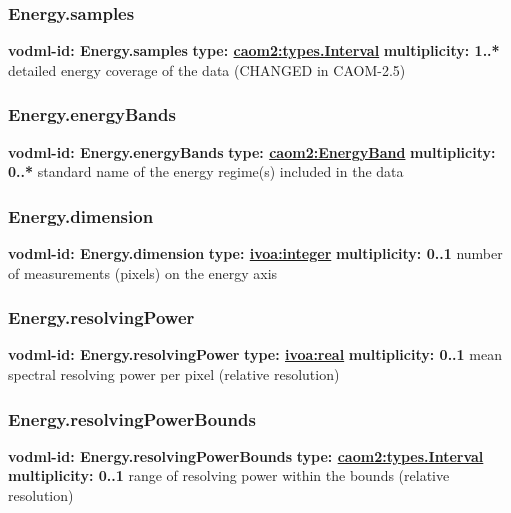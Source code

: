     \subsubsection{Energy.samples}
      \textbf{vodml-id: Energy.samples} \newline
      \textbf{type: \hyperref[sect:types.Interval]{caom2:types.Interval}} \newline
      \textbf{multiplicity: 1..*} \newline
      detailed energy coverage of the data (CHANGED in CAOM-2.5)

    \subsubsection{Energy.energyBands}
      \textbf{vodml-id: Energy.energyBands} \newline
      \textbf{type: \hyperref[sect:EnergyBand]{caom2:EnergyBand}} \newline
      \textbf{multiplicity: 0..*} \newline
      standard name of the energy regime(s) included in the data

    \subsubsection{Energy.dimension}
      \textbf{vodml-id: Energy.dimension} \newline
      \textbf{type: \hyperref[sect:ivoa]{ivoa:integer}} \newline
      \textbf{multiplicity: 0..1} \newline
      number of measurements (pixels) on the energy axis

    \subsubsection{Energy.resolvingPower}
      \textbf{vodml-id: Energy.resolvingPower} \newline
      \textbf{type: \hyperref[sect:ivoa]{ivoa:real}} \newline
      \textbf{multiplicity: 0..1} \newline
      mean spectral resolving power per pixel (relative resolution)

    \subsubsection{Energy.resolvingPowerBounds}
      \textbf{vodml-id: Energy.resolvingPowerBounds} \newline
      \textbf{type: \hyperref[sect:types.Interval]{caom2:types.Interval}} \newline
      \textbf{multiplicity: 0..1} \newline
      range of resolving power within the bounds (relative resolution)

